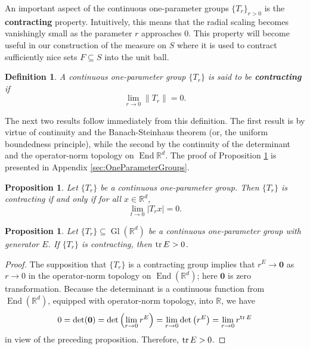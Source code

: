 \documentclass[11pt, letter]{book}
\newtheorem{definition}[theorem]{Definition}
\newtheorem{proposition}[theorem]{Proposition}
\newcommand\End{\operatorname{End}} %
\newcommand\Gl{\operatorname{Gl}} %
\renewcommand\det{\operatorname{det}}
\begin{document}
\noindent An important aspect of the continuous one-parameter groups $\{T_r \}_{r>0}$ is the \textbf{contracting} property. Intuitively, this means that the radial scaling becomes vanishingly small as the parameter $r$ approaches $0$. This property will become useful in our construction of the measure on $S$ where it is used to contract sufficiently nice sets $F\subseteq S$ into the unit ball.
\begin{framed}
\begin{definition} \label{def:contracting_group} A continuous one-parameter group $\{T_r\}$ is said to be \textbf{contracting} if
\begin{equation*}
\lim_{r\to 0}\|T_r\|=0. 
\end{equation*}
\end{definition}
\end{framed}

\noindent The next two results follow immediately from this definition. The first result is by virtue of continuity and the Banach-Steinhaus theorem (or, the uniform boundedness principle), while the second by the continuity of the determinant and the operator-norm topology on $\End{\mathbb{R}^d}$. The proof of Proposition \ref{prop:ContractingCharacterization} is presented in Appendix \ref{sec:OneParameterGroups}.
\begin{framed}
\begin{proposition}\label{prop:ContractingCharacterization}
Let $\{T_r\}$ be a continuous one-parameter group. Then $\{T_r\}$ is contracting if and only if for all $x\in\mathbb{R}^d$,
\begin{equation}
\lim_{t\to 0}|T_r x|=0.
\end{equation}
\end{proposition}
\end{framed}

\begin{framed}
\begin{proposition}\label{prop:ContractingTrace}
Let $\{T_r\}\subseteq \Gl(\mathbb{R}^d)$ be a continuous one-parameter group with generator $E$. If $\{T_r\}$ is  contracting, then $\tr E>0$.
\end{proposition}
\end{framed}
\begin{proof}
The supposition that $\{T_r\}$ is a contracting group implies that $r^E\to \mathbf{0}$ as $r\to 0$ in the operator-norm topology on $\End(\mathbb{R}^d)$; here $\mathbf{0}$ is zero transformation. Because the determinant is a continuous function from $\End(\mathbb{R}^d)$, equipped with operator-norm topology, into $\mathbb{R}$, we have
\begin{equation*}
0=\det(\mathbf{0})=\det\left(\lim_{r\to 0}r^E\right)=\lim_{r\to 0}\det\left(r^E\right)=\lim_{r\to 0}r^{\tr E}
\end{equation*}
in view of the preceding proposition. Therefore, $\tr E>0$.
\end{proof}
\end{document}
